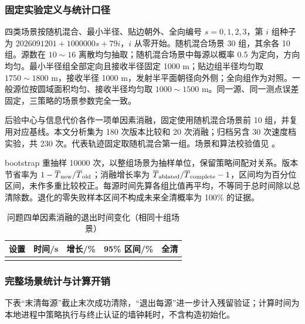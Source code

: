\subsubsection{固定实验定义与统计口径}
四类场景按随机混合、最小半径、贴边朝外、全向编号 $s=0,1,2,3$，第 $i$ 组种子为 $2026091201+1000000s+79i$，$i$ 从零开始。随机混合场景 30 组，其余各 10 组。源数在 $10\sim16$ 离散均匀抽取；随机混合场景中每源以概率 0.5 为定向，方向均匀。最小半径组全部定向且接收半径固定 1000 m；贴边组半径均匀取 $1750\sim1800$ m，接收半径 1000 m，发射半平面朝径向外侧；全向组作为对照。一般源位按圆域面积均匀、接收半径均匀取 $1000\sim1500$ m。同一源、同一测点误差固定，三策略的场景参数完全一致。

后验中心与信息代价各作一项单因素消融，固定使用随机混合场景前 10 组，并复用对应基线。本文分析集为 180 次版本比较和 20 次消融；归档另含 30 次速度档实验，共 230 次。代表轨迹固定取随机混合第一组。场景和算法校验值见 。

bootstrap 重抽样 10000 次，以整组场景为抽样单位，保留策略间配对关系。版本节省率为 $1-\overline T_{\rm new}/\overline T_{\rm old}$；消融增长率为 $\overline T_{\rm ablated}/\overline T_{\rm complete}-1$，区间均为百分位区间，未作多重比较校正。每源时间先算各组比值再平均，不等同于总时间除以总清除数。退化的零失败样本区间不构成未来全清概率为 100\% 的证据。

\begin{table}[H]\centering
\caption{问题四单因素消融的退出时间变化（相同十组场景）}
\begin{tabular}{@{}lrrrr@{}}\toprule
设置 & 时间/s & 增长/\% & 95\% 区间/\% & 全清\\\midrule
\\
\bottomrule\end{tabular}\end{table}

\subsubsection{完整场景统计与计算开销}
下表“末清每源”截止末次成功清除，“退出每源”进一步计入残留验证；计算时间为本地进程中策略执行与终止认证的墙钟耗时，不含构造初始化。
\begin{table}[H]\centering
\setlength{\tabcolsep}{3pt}
\caption{问题四三代策略在全部场景上的补充统计}
\end{table}

